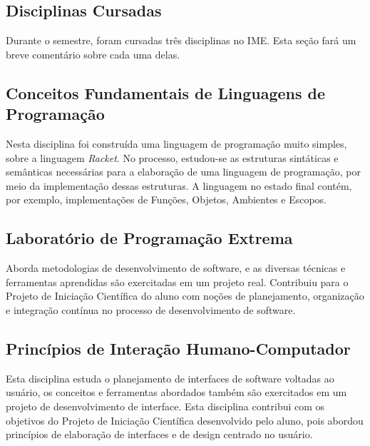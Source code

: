 \documentclass[a4paper, 11pt, twoside]{article}
\begin{document}
\begin{multicols}{2}

\newpage
\section{Disciplinas Cursadas}

Durante o semestre, foram cursadas três disciplinas no IME.
Esta seção fará um breve comentário sobre cada uma delas.

\subsection{Conceitos Fundamentais de Linguagens de Programação}

Nesta disciplina foi construída uma linguagem de programação muito
simples, sobre a linguagem \textit{Racket}. No processo, estudou-se
as estruturas sintáticas e semânticas necessárias para a elaboração
de uma linguagem de programação, por meio da implementação dessas
estruturas. A linguagem no estado final contém, por exemplo,
implementações de Funções, Objetos, Ambientes e Escopos.

\subsection{Laboratório de Programação Extrema}

Aborda metodologias de desenvolvimento de software, e as
diversas técnicas e ferramentas aprendidas são exercitadas em
um projeto real. Contribuiu para o Projeto de Iniciação Científica
do aluno com noções de planejamento, organização e integração contínua
no processo de desenvolvimento de software.

\subsection{Princípios de Interação Humano-Computador}

Esta disciplina estuda o planejamento de interfaces de software voltadas 
ao usuário, os conceitos e ferramentas abordados também são exercitados
em um projeto de desenvolvimento de interface. Esta disciplina contribui com
os objetivos do Projeto de Iniciação Científica desenvolvido pelo aluno,
pois abordou princípios de elaboração de interfaces e de design centrado
no usuário.

\end{multicols}

\newpage


\end{document}
